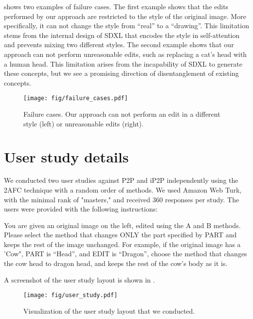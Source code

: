  shows two examples of failure cases.
The first example shows that the edits performed by our approach are restricted to the style of the original image.
More specifically, it can not change the style from ``real'' to a ``drawing''.
This limitation stems from the internal design of SDXL that encodes the style in self-attention and prevents mixing two different styles. 
The second example shows that our approach can not perform unreasonable edits, such as replacing a cat's head with a human head.
This limitation arises from the incapability of SDXL to generate these concepts, but we see a promising direction of disentanglement of existing concepts. 
\begin{figure*}
    \centering
    \texttt{[image: fig/failure\_cases.pdf]}
    \caption{Failure cases. Our approach can not perform an edit in a different style (left) or unreasonable edits (right).}
    \label{fig:fail}
\end{figure*}
% 




\section{User study details}
\label{sec:user_study}
We conducted two user studies against P2P and iP2P independently using the 2AFC technique with a random order of methods. 
We used Amazon Web Turk, with the minimal rank of "masters," and received 360 responses per study. 
The users were provided with the following instructions:
\begin{blockquote}
    You are given an original image on the left, edited using the A and B methods. Please select the method that changes ONLY the part specified by PART and keeps the rest of the image unchanged.
    For example, if the original image has a 'Cow", PART is “Head”, and EDIT is “Dragon”, choose the method that changes the cow head to dragon head, and keeps the rest of the cow’s body as it is.
\end{blockquote}
A screenshot of the user study layout is shown in .


\begin{figure*}
    \centering
    \texttt{[image: fig/user\_study.pdf]}
    \caption{Visualization of the user study layout that we conducted.}
    \label{fig:user_study}
\end{figure*}



